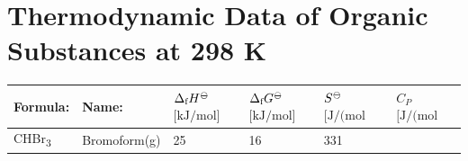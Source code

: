 \documentclass[
  9pt,
]{extbook}
\theoremstyle{definition}
\theoremstyle{definition}
\theoremstyle{definition}
\theoremstyle{remark}
\begin{document}
\hypertarget{thermodynamic-data-of-organic-substances-at-298-k}{%
\section{Thermodynamic Data of Organic Substances at 298 K}\label{thermodynamic-data-of-organic-substances-at-298-k}}

\begin{longtable}[]{@{}llllll@{}}
\toprule
\begin{minipage}[b]{0.07\columnwidth}\raggedright
Formula:\strut
\end{minipage} & \begin{minipage}[b]{0.17\columnwidth}\raggedright
Name:\strut
\end{minipage} & \begin{minipage}[b]{0.15\columnwidth}\raggedright
\(\Delta_{\text{f}} H^{-\kern-6pt{\ominus}\kern-6pt-}\)
\(\scriptstyle{\text{[kJ/mol]}}\)\strut
\end{minipage} & \begin{minipage}[b]{0.15\columnwidth}\raggedright
\(\Delta_{\text{f}} G^{-\kern-6pt{\ominus}\kern-6pt-}\)
\(\scriptstyle{\text{[kJ/mol]}}\)\strut
\end{minipage} & \begin{minipage}[b]{0.14\columnwidth}\raggedright
\(S^{-\kern-6pt{\ominus}\kern-6pt-}\)
\(\scriptstyle{\text{[J/(mol K)]}}\)\strut
\end{minipage} & \begin{minipage}[b]{0.14\columnwidth}\raggedright
\(C_P\)
\(\scriptstyle{\text{[J/(mol K)]}}\)\strut
\end{minipage}\tabularnewline
\midrule
\endhead
\begin{minipage}[t]{0.07\columnwidth}\raggedright
CHBr\textsubscript{3}\strut
\end{minipage} & \begin{minipage}[t]{0.17\columnwidth}\raggedright
Bromoform(g)\strut
\end{minipage} & \begin{minipage}[t]{0.15\columnwidth}\raggedright
25\strut
\end{minipage} & \begin{minipage}[t]{0.15\columnwidth}\raggedright
16\strut
\end{minipage} & \begin{minipage}[t]{0.14\columnwidth}\raggedright
331\strut
\end{minipage} & \begin{minipage}[t]{0.14\columnwidth}\raggedright

\end{minipage}
\end{longtable}
\end{document}
